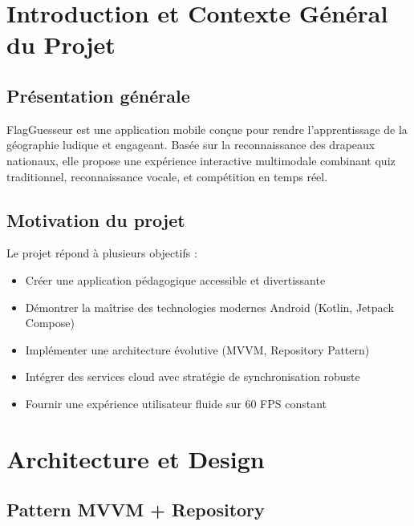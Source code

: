 \documentclass[12pt,a4paper,openany]{report}
\begin{document}

    \newpage

    \chapter{Introduction et Contexte Général du Projet}

    \section{Présentation générale}

    FlagGuesseur est une application mobile conçue pour rendre l'apprentissage de la géographie ludique et engageant. Basée sur la reconnaissance des drapeaux nationaux, elle propose une expérience interactive multimodale combinant quiz traditionnel, reconnaissance vocale, et compétition en temps réel.

    \section{Motivation du projet}

    Le projet répond à plusieurs objectifs :
    \begin{itemize}
      \item Créer une application pédagogique accessible et divertissante
      \item Démontrer la maîtrise des technologies modernes Android (Kotlin, Jetpack Compose)
      \item Implémenter une architecture évolutive (MVVM, Repository Pattern)
      \item Intégrer des services cloud avec stratégie de synchronisation robuste
      \item Fournir une expérience utilisateur fluide sur 60 FPS constant
    \end{itemize}

    \chapter{Architecture et Design}

    \section{Pattern MVVM + Repository}
\end{document}
